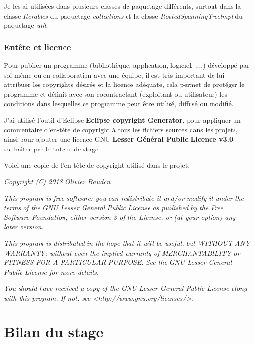 \documentclass[12pt]{report}
\begin{document}
Je les ai utilisées dans plusieurs classes de paquetage différents, surtout dans la classe \textit{Iterables} du paquetage \textit{collections} et la classe \textit{RootedSpanningTreelmpl} du paquetage \textit{util}.\newline

\subsection{Entête et licence}

Pour publier un programme (bibliothèque, application, logiciel, ....) développé par soi-même ou en collaboration avec une équipe, il est très important de lui attribuer les copyrights désirés et la licence adéquate, cela permet de protéger le programme et définit avec son cocontractant (exploitant ou utilisateur) les conditions dans lesquelles ce programme peut être utilisé, diffusé ou modifié.\newline

J'ai utilisé l'outil d'Eclipse \textbf{Eclipse copyright Generator}, pour appliquer un commentaire d'en-tête de copyright à tous les fichiers sources dans les projets, ainsi pour ajouter une licence GNU \textbf{Lesser Général Public Licence v3.0} souhaiter par le tuteur de stage.\newline 

Voici une copie de l'en-tête de copyright utilisé dans le projet:\newline

\begin{center}
\textit{Copyright (C) 2018 Olivier Baudon}

\textit{This program is free software: you can redistribute it and/or modify}
\textit{it under the terms of the GNU Lesser General Public License as published by}
\textit{the Free Software Foundation, either version 3 of the License, or}
\textit{(at your option) any later version.}

\textit{This program is distributed in the hope that it will be useful,}
\textit{but WITHOUT ANY WARRANTY; without even the implied warranty of}
\textit{MERCHANTABILITY or FITNESS FOR A PARTICULAR PURPOSE.  See the}
\textit{GNU Lesser General Public License for more details.}

\textit{You should have received a copy of the GNU Lesser General Public License}
\textit{along with this program.  If not, see <http://www.gnu.org/licenses/>.}
\end{center}

\chapter{Bilan du stage} 
\end{document}
